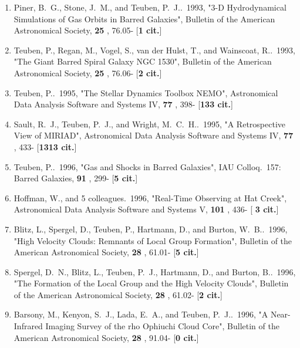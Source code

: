\documentclass[11pt,letterpaper]{article}
\begin{document}
\begin{enumerate}[resume,label=\textbf{\arabic*}.]
\item  
Piner, B.~G., Stone, J.~M., and Teuben, P.~J..\  1993,  "3-D Hydrodynamical 
Simulations of Gas Orbits in Barred Galaxies", Bulletin of the American 
Astronomical Society,  {\bf 25} , 76.05- [{\bf 1 cit.}] 

\item  
Teuben, P., Regan, M., Vogel, S., van der Hulst, T., and Wainscoat, R..\  
1993,  "The Giant Barred Spiral Galaxy NGC 1530", Bulletin of the American 
Astronomical Society,  {\bf 25} , 76.06- [{\bf 2 cit.}] 

\item  
Teuben, P..\  1995,  "The Stellar Dynamics Toolbox NEMO", Astronomical Data 
Analysis Software and Systems IV,  {\bf 77} , 398- [{\bf 133 cit.}] 

\item  
Sault, R.~J., Teuben, P.~J., and Wright, M.~C.~H..\  1995,  "A 
Retrospective View of MIRIAD", Astronomical Data Analysis Software and 
Systems IV,  {\bf 77} , 433- [{\bf 1313 cit.}] 

\item  
Teuben, P..\  1996,  "Gas and Shocks in Barred Galaxies", IAU Colloq.~157: 
Barred Galaxies,  {\bf 91} , 299- [{\bf 5 cit.}] 

\item  
Hoffman, W., and 5 colleagues.\  1996,  "Real-Time Observing at Hat Creek", 
Astronomical Data Analysis Software and Systems V,  {\bf 101} , 436- [{\bf 
3 cit.}] 


\item  
Blitz, L., Spergel, D., Teuben, P., Hartmann, D., and Burton, W.~B..\  
1996,  "High Velocity Clouds: Remnants of Local Group Formation", Bulletin 
of the American Astronomical Society,  {\bf 28} , 61.01- [{\bf 5 cit.}] 

\item  
Spergel, D.~N., Blitz, L., Teuben, P.~J., Hartmann, D., and Burton, B..\  
1996,  "The Formation of the Local Group and the High Velocity Clouds", 
Bulletin of the American Astronomical Society,  {\bf 28} , 61.02- [{\bf 2 
cit.}] 

\item  
Barsony, M., Kenyon, S.~J., Lada, E.~A., and Teuben, P.~J..\  1996,  "A 
Near-Infrared Imaging Survey of the rho Ophiuchi Cloud Core", Bulletin of 
the American Astronomical Society,  {\bf 28} , 91.04- [{\bf 0 cit.}] 


\end{enumerate}
\end{document}
